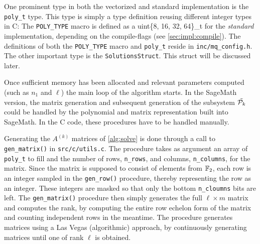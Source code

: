 One prominent type in both the vectorized and standard implementation is the \texttt{poly\_t} type. This type is simply a type definition reusing different integer types in C:
The \texttt{POLY\_TYPE} macro is defined as a uint\{8, 16, 32, 64\}\_t for the \textit{standard} implementation, depending on the compile-flags (see \cref{sec:impl:compile}). The definitions of both the \texttt{POLY\_TYPE} macro and \texttt{poly\_t} reside in \texttt{inc/mq\_config.h}. The other important type is the \texttt{SolutionsStruct}. This struct will be discussed later.

Once sufficient memory has been allocated and relevant parameters computed (such as $n_1$ and $\ell$) the main loop of the algorithm starts. In the SageMath version, the matrix generation and subsequent generation of the subsystem $\Tilde{\mathcal{P}_k}$ could be handled by the polynomial and matrix representation built into SageMath. In the C code, these procedures have to be handled manually. 

Generating the $A^{(k)}$ matrices of \cref{alg:solve} is done through a call to \texttt{gen\_matrix()} in \texttt{src/c/utils.c}. The procedure takes as argument an array of \texttt{poly\_t} to fill and the number of rows, \texttt{n\_rows}, and columns, \texttt{n\_columns}, for the matrix. Since the matrix is supposed to consist of elements from $\mathbb{F}_2$, each row is an integer sampled in the \texttt{gen\_row()} procedure, thereby representing the row as an integer. These integers are masked so that only the bottom \texttt{n\_cloumns} bits are left. The \texttt{gen\_matrix()} procedure then simply generates the full $\ell \times m$ matrix and computes the rank, by computing the entire row echelon form of the matrix and counting independent rows in the meantime. The procedure generates matrices using a Las Vegas (algorithmic) approach, by continuously generating matrices until one of rank $\ell$ is obtained.

